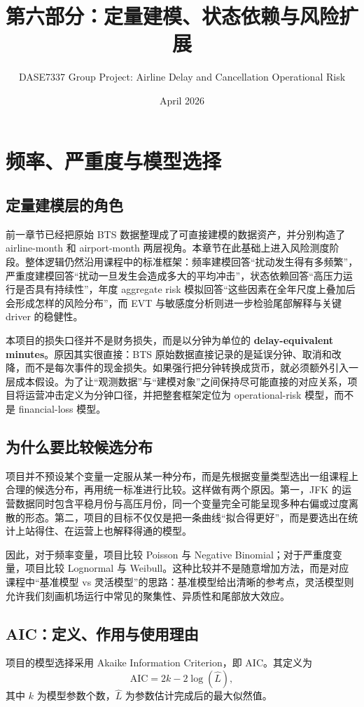 \documentclass[UTF8,fontset=fandol,11pt]{ctexart}
\title{\textbf{第六部分：定量建模、状态依赖与风险扩展}}
\author{DASE7337 Group Project: Airline Delay and Cancellation Operational Risk}
\date{April 2026}
\begin{document}
\maketitle

\setcounter{section}{5}

\section{频率、严重度与模型选择}

\subsection{定量建模层的角色}
前一章节已经把原始 BTS 数据整理成了可直接建模的数据资产，并分别构造了 airline-month 和 airport-month 两层视角。本章节在此基础上进入风险测度阶段。整体逻辑仍然沿用课程中的标准框架：频率建模回答“扰动发生得有多频繁”，严重度建模回答“扰动一旦发生会造成多大的平均冲击”，状态依赖回答“高压力运行是否具有持续性”，年度 aggregate risk 模拟回答“这些因素在全年尺度上叠加后会形成怎样的风险分布”，而 EVT 与敏感度分析则进一步检验尾部解释与关键 driver 的稳健性。

本项目的损失口径并不是财务损失，而是以分钟为单位的 \textbf{delay-equivalent minutes}。原因其实很直接：BTS 原始数据直接记录的是延误分钟、取消和改降，而不是每次事件的现金损失。如果强行把分钟转换成货币，就必须额外引入一层成本假设。为了让“观测数据”与“建模对象”之间保持尽可能直接的对应关系，项目将运营冲击定义为分钟口径，并把整套框架定位为 operational-risk 模型，而不是 financial-loss 模型。

\subsection{为什么要比较候选分布}
项目并不预设某个变量一定服从某一种分布，而是先根据变量类型选出一组课程上合理的候选分布，再用统一标准进行比较。这样做有两个原因。第一，JFK 的运营数据同时包含平稳月份与高压月份，同一个变量完全可能呈现多种右偏或过度离散的形态。第二，项目的目标不仅仅是把一条曲线“拟合得更好”，而是要选出在统计上站得住、在运营上也解释得通的模型。

因此，对于频率变量，项目比较 Poisson 与 Negative Binomial；对于严重度变量，项目比较 Lognormal 与 Weibull。这种比较并不是随意增加方法，而是对应课程中“基准模型 vs 灵活模型”的思路：基准模型给出清晰的参考点，灵活模型则允许我们刻画机场运行中常见的聚集性、异质性和尾部放大效应。

\subsection{AIC：定义、作用与使用理由}
项目的模型选择采用 Akaike Information Criterion，即 AIC。其定义为
\[
\mathrm{AIC}=2k-2\log(\hat{L}),
\]
其中 \(k\) 为模型参数个数，\(\hat{L}\) 为参数估计完成后的最大似然值。
\end{document}
